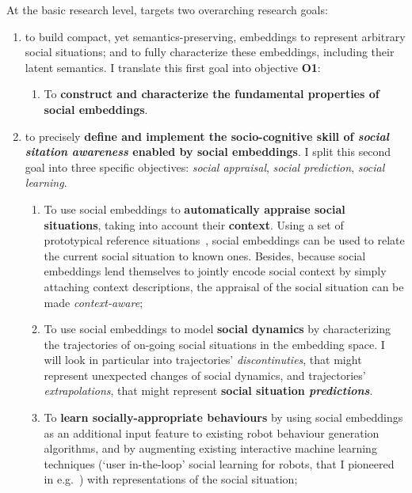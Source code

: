 \vspace{1em}

\noindent At the basic research level, \project targets two overarching research goals:

\begin{enumerate}[label=\textbf{(\arabic*)}]
    \item to build compact, yet semantics-preserving, embeddings to represent
arbitrary social situations; and to fully characterize these embeddings,
including their latent semantics. I translate this first goal into objective
{\bf O1}:

\begin{enumerate}[label=\textbf{O\arabic*}]
    \item \label{O1} To \textbf{construct and characterize the fundamental
properties of social embeddings}.
\end{enumerate}

    \item to precisely \textbf{define and implement the socio-cognitive skill of
        \emph{social sitation awareness} enabled by social embeddings}. I split this
        second goal into three specific objectives: \emph{social appraisal},
        \emph{social prediction}, \emph{social learning}.

\begin{enumerate}[label=\textbf{O2.\arabic*}]
    \item \label{O2.1} To use social embeddings to \textbf{automatically appraise
        social situations}, taking into account their \textbf{context}. Using
        a set of prototypical reference situations~\cite{kelley2003atlas}, social embeddings
        can be used to relate the current social situation to known ones.
        Besides, because social embeddings lend themselves to jointly encode
        social context by simply attaching context descriptions, the appraisal
        of the social situation can be made \emph{context-aware};

    \item \label{O2.2} To use social embeddings to model \textbf{social
        dynamics} by characterizing the trajectories of on-going social situations in the
        embedding space. I will look in particular into trajectories'
        \emph{discontinuties}, that might represent unexpected changes of social
        dynamics, and trajectories' \emph{extrapolations}, that might represent
        \textbf{social situation \emph{predictions}}.

    \item \label{O2.3} To \textbf{learn socially-appropriate behaviours} by using
        social embeddings as an additional input feature to existing robot behaviour
        generation algorithms, and by augmenting existing interactive machine
        learning techniques (`user in-the-loop' social learning for robots, that I
        pioneered in e.g.~\cite{winkle2021leador}) with
        representations of the social situation;

\end{enumerate}
\end{enumerate}

